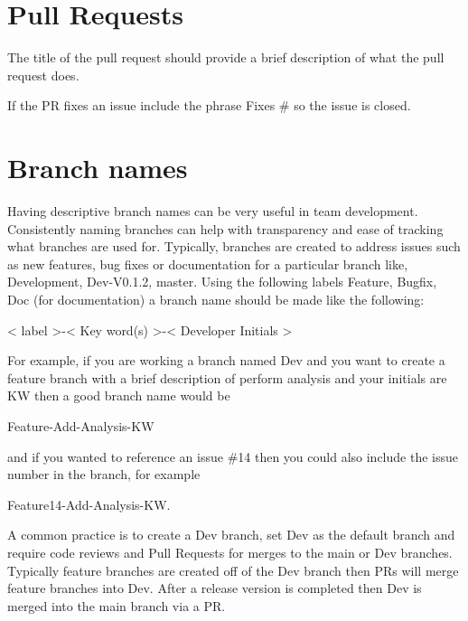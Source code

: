 \documentclass[
]{book}
\begin{document}
\hypertarget{pull-requests}{%
\section{Pull Requests}\label{pull-requests}}

The title of the pull request should provide a brief description of what the pull request does.

If the PR fixes an issue include the phrase Fixes \# so the issue is closed.

\hypertarget{branch-names}{%
\section{Branch names}\label{branch-names}}

Having descriptive branch names can be very useful in team development. Consistently naming branches can help with transparency and ease of tracking what branches are used for. Typically, branches are created to address issues such as new features, bug fixes or documentation for a particular branch like, Development, Dev-V0.1.2, master. Using the following labels Feature, Bugfix, Doc (for documentation) a branch name should be made like the following:

\textless{} label \textgreater-\textless{} Key word(s) \textgreater-\textless{} Developer Initials \textgreater{}

For example, if you are working a branch named Dev and you want to create a feature branch with a brief description of perform analysis and your initials are KW then a good branch name would be

Feature-Add-Analysis-KW

and if you wanted to reference an issue \#14 then you could also include the issue number in the branch, for example

Feature14-Add-Analysis-KW.

A common practice is to create a Dev branch, set Dev as the default branch and require code reviews and Pull Requests for merges to the main or Dev branches. Typically feature branches are created off of the Dev branch then PRs will merge feature branches into Dev. After a release version is completed then Dev is merged into the main branch via a PR.
\end{document}
